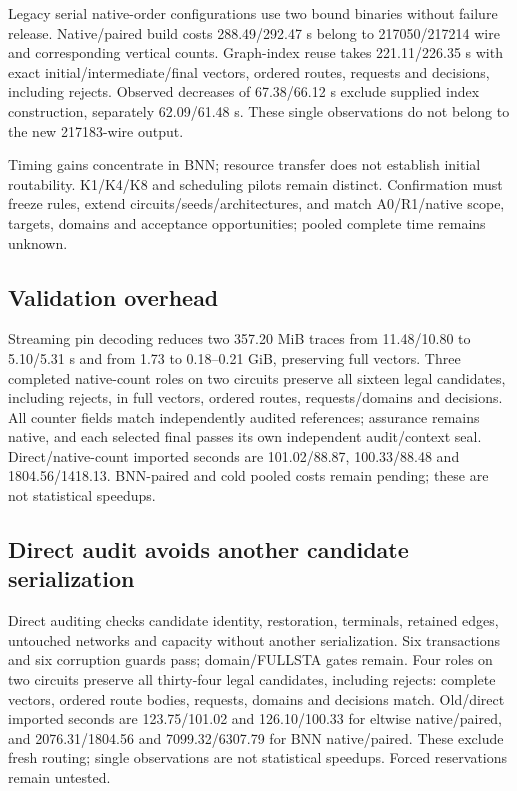 \documentclass[conference,10pt]{IEEEtran}
\begin{document}
Legacy serial native-order configurations use two bound binaries without failure release. Native/paired build costs 288.49/292.47 s belong to 217050/217214 wire and corresponding vertical counts. Graph-index reuse takes 221.11/226.35 s with exact initial/intermediate/final vectors, ordered routes, requests and decisions, including rejects. Observed decreases of 67.38/66.12 s exclude supplied index construction, separately 62.09/61.48 s. These single observations do not belong to the new 217183-wire output.

Timing gains concentrate in BNN; resource transfer does not establish initial routability. K1/K4/K8 and scheduling pilots remain distinct. Confirmation must freeze rules, extend circuits/seeds/architectures, and match A0/R1/native scope, targets, domains and acceptance opportunities; pooled complete time remains unknown.

\subsection{Validation overhead}
Streaming pin decoding reduces two 357.20 MiB traces from 11.48/10.80 to 5.10/5.31 s and from 1.73 to 0.18--0.21 GiB, preserving full vectors. Three completed native-count roles on two circuits preserve all sixteen legal candidates, including rejects, in full vectors, ordered routes, requests/domains and decisions. All counter fields match independently audited references; assurance remains native, and each selected final passes its own independent audit/context seal. Direct/native-count imported seconds are 101.02/88.87, 100.33/88.48 and 1804.56/1418.13. BNN-paired and cold pooled costs remain pending; these are not statistical speedups.

\subsection{Direct audit avoids another candidate serialization}
Direct auditing checks candidate identity, restoration, terminals, retained edges, untouched networks and capacity without another serialization. Six transactions and six corruption guards pass; domain/FULLSTA gates remain. Four roles on two circuits preserve all thirty-four legal candidates, including rejects: complete vectors, ordered route bodies, requests, domains and decisions match. Old/direct imported seconds are 123.75/101.02 and 126.10/100.33 for eltwise native/paired, and 2076.31/1804.56 and 7099.32/6307.79 for BNN native/paired. These exclude fresh routing; single observations are not statistical speedups. Forced reservations remain untested.
\end{document}

